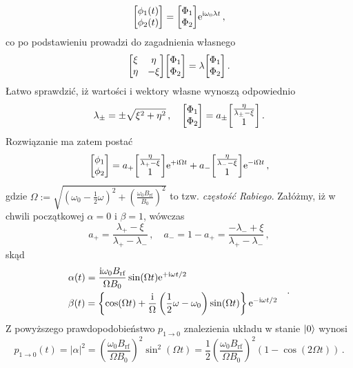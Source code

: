 \documentclass{myclass}
\begin{document}
\begin{equation*}
    \mqty[\phi_1(t) \\ \phi_2(t)] = \mqty[\Phi_1 \\ \Phi_2] \e^{\im\omega_0\lambda t}\,,
\end{equation*}
co po podstawieniu prowadzi do zagadnienia własnego
\begin{equation*}
    \mqty[\xi & \eta \\ \eta & -\xi]\mqty[\Phi_1 \\ \Phi_2] = \lambda \mqty[\Phi_1 \\ \Phi_2]\,.
\end{equation*}
Łatwo sprawdzić, iż wartości i wektory własne wynoszą odpowiednio
\begin{equation*}
    \lambda_\pm = \pm \sqrt{\xi^2 + \eta^2}\,,\quad \mqty[\Phi_1 \\ \Phi_2] = a_\pm\mqty[\frac{\eta}{\lambda_\pm - \xi} \\ 1]\,.
\end{equation*}
Rozwiązanie ma zatem postać
\begin{equation*}
    \mqty[\phi_1 \\ \phi_2] = a_+\mqty[\frac{\eta}{\lambda_+-\xi}\\1]\e^{+\im\Omega t} + a_-\mqty[\frac{\eta}{\lambda_--\xi}\\1]\e^{-\im\Omega t}\,,
\end{equation*}
gdzie \(\boxed{\Omega := \sqrt{\left(\omega_0 - \frac{1}{2}\omega\right)^2 +
\left(\frac{\omega_0B_\text{rf}}{B_0}\right)^2}}\) to tzw. \textit{częstość Rabiego}. Załóżmy, iż w
chwili początkowej \(\alpha = 0\) i \(\beta = 1\), wówczas
\begin{equation*}
    a_+ = \frac{\lambda_+ - \xi}{\lambda_+ - \lambda_-}\,,\quad a_- = 1 - a_+ = \frac{-\lambda_-+\xi}{\lambda_+ - \lambda_-}\,,
\end{equation*}
skąd
\begin{equation*}
    \begin{split}
        &\alpha(t) = \frac{\mathrm{i}\omega_0B_\text{rf}}{\Omega B_0}\sin(\Omega t)\mathrm{e}^{+\mathrm{i}\omega t/2}\\
        &\beta(t) = \left\{\cos(\Omega t) +\frac{\mathrm{i}}{\Omega}\left(\frac{1}{2}\omega - \omega_0\right)\sin(\Omega t)\right\}\mathrm{e}^{-\mathrm{i}\omega t/2}
    \end{split}\quad.
\end{equation*}
Z powyższego prawdopodobieństwo \(p_{1\to0}\) znalezienia układu w stanie \(\ket{0}\) wynosi
\begin{equation*}
        p_{1\to0}(t) = |\alpha|^2 = \left(\frac{\omega_0B_\text{rf}}{\Omega B_0}\right)^2\sin^2(\Omega t) = \frac{1}{2}\left(\frac{\omega_0B_\text{rf}}{\Omega B_0}\right)^2(1-\cos(2\Omega t))\,.
\end{equation*}
\end{document}
